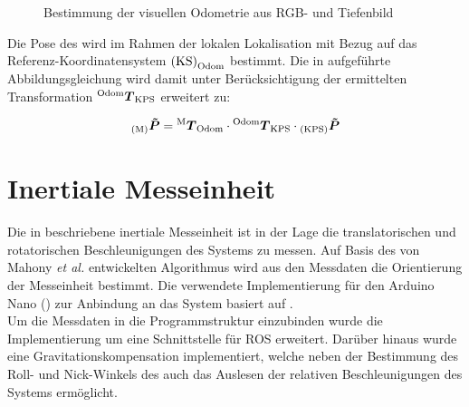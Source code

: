 \begin{figure}[!ht]
	\begin{center}
	\hspace{5mm}
	\caption{Bestimmung der visuellen Odometrie aus RGB- und Tiefenbild}
	\label{fig.fovis}
	\end{center}
\end{figure}

Die Pose des  wird im Rahmen der lokalen Lokalisation mit Bezug auf das Referenz-Koordinatensystem ${\mathrm{(KS)}}_{\mathrm{Odom}}$ bestimmt. Die in  aufgeführte Abbildungsgleichung wird damit unter Berücksichtigung der ermittelten Transformation ${^{\mathrm{Odom}}\mbox{\boldmath{$T$}}_{\mathrm{KPS}}}$ erweitert zu:

\begin{equation}
{_{{\mathrm{(M)}}}}\mbox{\boldmath{$\tilde{P}$}} = {^{\mathrm{M}}\mbox{\boldmath{$T$}}_{\mathrm{Odom}}} \cdot {^{\mathrm{Odom}}\mbox{\boldmath{$T$}}_{\mathrm{KPS}}} \cdot {_{{\mathrm{(KPS)}}}}\mbox{\boldmath{$\tilde{P}$}}
\label{eq.locloc}
\end{equation}

\prever{
}
\prever{
}
\section{Inertiale Messeinheit}
Die in  beschriebene inertiale Messeinheit ist in der Lage die translatorischen und rotatorischen Beschleunigungen des Systems zu messen. Auf Basis des von Mahony \textit{et al.} \cite{Mahony2008} entwickelten Algorithmus wird aus den Messdaten die Orientierung der Messeinheit bestimmt. Die verwendete Implementierung für den Arduino Nano () zur Anbindung an das System basiert auf \cite{IMUCode}.\\
Um die Messdaten in die Programmstruktur einzubinden wurde die Implementierung um eine Schnittstelle für ROS erweitert. Darüber hinaus wurde eine Gravitationskompensation implementiert, welche neben der Bestimmung des Roll- und Nick-Winkels des  auch das Auslesen der relativen Beschleunigungen des Systems ermöglicht.\\

